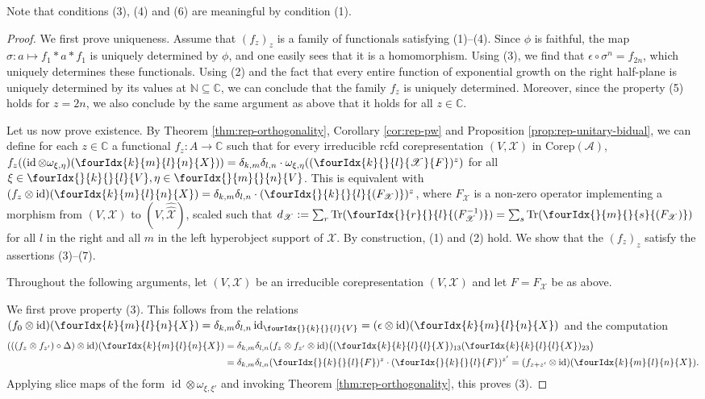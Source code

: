 \documentclass[10pt]{article}
\DeclareMathOperator{\id}{id}
\newcommand{\dualco}[1]{\hat{#1}}
\newcommand{\Corep}{\mathrm{Corep}}
\newcommand{\C}{\mathbb{C}}
\newcommand{\N}{\mathbb{N}}
\newcommand{\Tr}{\mathrm{Tr}}
\newcommand{\Gr}[5]{\fourIdx{#2}{#4}{#3}{#5}{#1}}%
\newcommand{\Gru}[3]{\Gr{#1}{}{}{#2}{#3}}
\theoremstyle{definition}
\numberwithin{equation}{section}
\begin{document}
Note that conditions (3), (4) and (6) are meaningful by condition (1).

\begin{proof}
  We first prove uniqueness.  Assume that $(f_{z})_{z}$ is a family of
  functionals satisfying (1)--(4).  Since $\phi$ is faithful, the map
  $\sigma\colon a \mapsto f_{1} \ast a \ast f_{1}$ is uniquely
  determined by $\phi$, and one easily sees that it is a homomorphism. Using
  (3), we find that $\epsilon \circ \sigma^n=f_{2n}$, which uniquely determines these functionals. Using (2) and the
  fact that every entire function of exponential growth on the right
  half-plane is uniquely determined by its values at $\N \subseteq \C$, we can conclude that the family $f_{z}$ is uniquely determined. Moreover, since the property (5) holds for $z = 2n$, we also conclude by the same argument as above that it holds for all $z\in \C$.

  Let us now prove existence.  By Theorem \ref{thm:rep-orthogonality}, Corollary \ref{cor:rep-pw} and Proposition \ref{prop:rep-unitary-bidual}, we can
  define for each $z\in \C$ a functional $f_{z} \colon A \to \C$ such
  that for every 
  irreducible rcfd corepresentation
  $(V,\mathscr{X})$ in $\Corep(\mathscr{A})$, $ f_{z}((\id \otimes \omega_{\xi,\eta})(\Gr{X}{k}{l}{m}{n})) =
      \delta_{k,m}\delta_{l,n} \cdot
      \omega_{\xi,\eta}((\Gr{F}{k}{l}{}{\mathscr{X}})^{z})$ for all $\xi \in \Gru{V}{k}{l},\eta \in
      \Gru{V}{m}{n}$. This is equivalent with $(f_{z} \otimes \id)(\Gr{X}{k}{l}{m}{n}) =
      \delta_{k,m}\delta_{l,n} \cdot (\Gru{(F_{\mathscr{X}})}{k}{l})^{z}$, 
    where $F_{\mathscr{X}}$ is a non-zero operator implementing a morphism from $(V,\mathscr{X})$ to
    $(V, \dualco{\dualco{\mathscr{X}}})$, scaled such that
    $d_{\mathscr{X}}:= \sum_{r} \Tr(\Gru{(F_{\mathscr{X}}^{-1})}{r}{l}) = \sum_{s}
      \Tr(\Gru{(F_{\mathscr{X}})}{m}{s})$
    for all $l$ in the right and all $m$ in the left hyperobject support of $\mathscr{X}$. By
    construction, (1) and (2) hold. We show that the $(f_{z})_{z}$ satisfy the
    assertions (3)--(7). 

        Throughout the following arguments, let 
    $(V,\mathscr{X})$ be an  irreducible corepresentation
    $(V,\mathscr{X})$ and let $F=F_{\mathscr{X}}$ be as above.

    We first prove property (3). This follows from the relations $(f_{0}  \otimes \id)(\Gr{X}{k}{l}{m}{n}) =
      \delta_{k,m}\delta_{l,n} \id_{\Gru{V}{k}{l}} =
      (\epsilon \otimes \id)(\Gr{X}{k}{l}{m}{n})$ and the computation
    \begin{align*}
      (((f_{z}\otimes f_{z'})\circ \Delta) \otimes
      \id)(\Gr{X}{k}{l}{m}{n}) &=  \delta_{k,m}\delta_{l,n}(f_{z} \otimes f_{z'} \otimes
      \id)\big((\Gr{X}{k}{l}{k}{l})_{13}
      (\Gr{X}{k}{l}{k}{l})_{23}\big) \\
      &=  \delta_{k,m}\delta_{l,n}(\Gru{F}{k}{l})^{z}  \cdot (\Gru{F}{k}{l})^{z'} = (f_{z+z'} \otimes \id)(\Gr{X}{k}{l}{m}{n}).
    \end{align*}
    Applying slice maps of the form $\id
    \otimes \omega_{\xi,\xi'}$ and invoking Theorem \ref{thm:rep-orthogonality}, this proves (3).


\end{proof}
\end{document}
